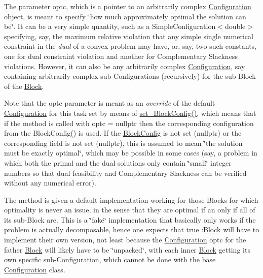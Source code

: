 The parameter optc, which is a pointer to an arbitrarily complex \mbox{\hyperlink{class_s_m_spp__di__unipi__it_1_1_configuration}{Configuration}} object, is meant to specify \char`\"{}how much approximately optimal
the solution can be\char`\"{}. It can be a very simple quantity, such as a Simple\+Configuration$<$double$>$ specifying, say, the maximum relative violation that any simple single numerical constraint in the {\itshape dual} of a convex problem may have, or, say, two such constants, one for dual constraint violation and another for Complementary Slackness violations. However, it can also be any arbitrarily complex \mbox{\hyperlink{class_s_m_spp__di__unipi__it_1_1_configuration}{Configuration}}, say containing arbitrarily complex sub-\/\+Configurations (recursively) for the sub-\/\+Block of the \mbox{\hyperlink{class_s_m_spp__di__unipi__it_1_1_block}{Block}}.

Note that the optc parameter is meant as an {\itshape override} of the default \mbox{\hyperlink{class_s_m_spp__di__unipi__it_1_1_configuration}{Configuration}} for this task set by means of \mbox{\hyperlink{class_s_m_spp__di__unipi__it_1_1_block_a18d411b740a47db00d15083c5c7ef2ba}{set\+\_\+\+Block\+Config()}}, which means that if the method is called with optc = nullptr then the corresponding configuration from the Block\+Config() is used. If the \mbox{\hyperlink{class_s_m_spp__di__unipi__it_1_1_block_config}{Block\+Config}} is not set (nullptr) or the corresponding field is not set (nullptr), this is assumed to mean \char`\"{}the solution must be exactly
optimal\char`\"{}, which may be possible in some cases (say, a problem in which both the primal and the dual solutions only contain \char`\"{}small\char`\"{} integer numbers so that dual feasibility and Complementary Slackness can be verified without any numerical error).

The method is given a default implementation working for those Blocks for which optimality is never an issue, in the sense that they are optimal if an only if all of its sub-\/\+Block are. This is a \char`\"{}fake\char`\"{} implementation that basically only works if the problem is actually decomposable, hence one expects that true \+:\mbox{\hyperlink{class_s_m_spp__di__unipi__it_1_1_block}{Block}} will have to implement their own version, not least because the \mbox{\hyperlink{class_s_m_spp__di__unipi__it_1_1_configuration}{Configuration}} optc for the father \mbox{\hyperlink{class_s_m_spp__di__unipi__it_1_1_block}{Block}} will likely have to be \char`\"{}unpacked\char`\"{}, with each inner \mbox{\hyperlink{class_s_m_spp__di__unipi__it_1_1_block}{Block}} getting its own specific sub-\/\+Configuration, which cannot be done with the base \mbox{\hyperlink{class_s_m_spp__di__unipi__it_1_1_configuration}{Configuration}} class. \mbox{\label{class_s_m_spp__di__unipi__it_1_1_block_a27ae9e4279482d52342c7958c34a43c6}} 
